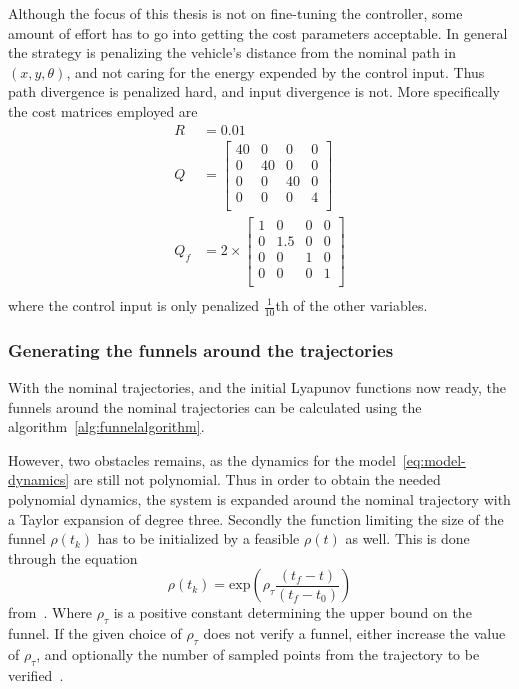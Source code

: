 Although the focus of this thesis is not on fine-tuning the controller, some
amount of effort has to go into getting the cost parameters acceptable. In
general the strategy is penalizing the vehicle's distance from the nominal path
in \((x,y,\theta)\), and not caring for the energy expended by the control
input. Thus path divergence is penalized hard, and input divergence is not. More
specifically the cost matrices employed are
\begin{align*}
  R &= 0.01 \\
  Q &= \begin{bmatrix}
    40 & 0 & 0 & 0 \\
    0 & 40 & 0 & 0 \\
    0 & 0 & 40 & 0 \\
    0 & 0 & 0 & 4 \\
  \end{bmatrix}
  \\
  Q_{f} &=
          2\times
  \begin{bmatrix}
    1 & 0 & 0 & 0 \\
    0 & 1.5 & 0 & 0 \\
    0 & 0 & 1 & 0 \\
    0 & 0 & 0 & 1 \\
  \end{bmatrix}
\\
\end{align*}
where the control input is only penalized \(\frac{1}{10}\)th of the other
variables.

\subsubsection{Generating the funnels around the trajectories}

With the nominal trajectories, and the initial Lyapunov functions now ready, the
funnels around the nominal trajectories can be calculated using the
algorithm~\ref{alg:funnelalgorithm}. %

However, two obstacles remains, as the dynamics for the
model~\ref{eq:model-dynamics} are still not polynomial. Thus in order to obtain
the needed polynomial dynamics, the system is expanded around the nominal
trajectory with a Taylor expansion of degree three. Secondly the function
limiting the size of the funnel \(\rho(t_{k})\) has to be initialized by a
feasible \(\rho(t)\) as well. This is done through the equation
\begin{equation}
  \rho(t_{k}) = \mathrm{exp}\left( \rho_{\tau}\frac{\left( t_{f} - t \right)}{\left( t_{f} - t_{0}  \right)}\right)
\end{equation}
from~\cite[eq.~6.sec~3]{tobenkinInvariantFunnelsTrajectories2010}. Where
\(\rho_{\tau}\) is a positive constant determining the upper bound on the
funnel. If the given choice of \(\rho_{\tau}\) does not verify a funnel, either
increase the value of \(\rho_{\tau}\), and optionally the number of sampled
points from the trajectory to be
verified~\cite{tobenkinInvariantFunnelsTrajectories2010}.

